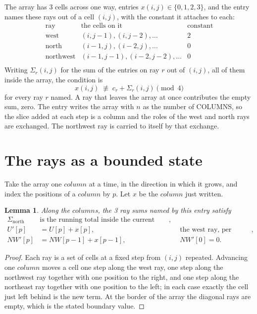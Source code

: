 \documentclass[11pt,a4paper]{article}
\theoremstyle{plain}
\newtheorem{lemma}[theorem]{Lemma}
\theoremstyle{definition}
\begin{document}
The array has $3$ cells across one way, entries $x(i,j)\in\{0,1,2,3\}$, and the entry names these
rays out of a cell $(i,j)$, with the constant it attaches to each:
\[
\begin{array}{lll}
\text{ray} & \text{the cells on it} & \text{constant} \\[2pt]
\text{west} & (i,j-1),(i,j-2),\dots & 2 \\
\text{north} & (i-1,j),(i-2,j),\dots & 0 \\
\text{northwest} & (i-1,j-1),(i-2,j-2),\dots & 0 \\
\end{array}
\]
Writing $\Sigma_r(i,j)$ for the sum of the entries on ray $r$ out of $(i,j)$, all of them
inside the array, the condition is
\[
x(i,j)\;\not\equiv\;c_r+\Sigma_r(i,j) \pmod{4}
\]
for every ray $r$ named. A ray that leaves the array at once contributes the empty sum,
zero. The entry writes the array with $n$ as the number of COLUMNS, so the slice added at each step is a column and the roles of the west and north rays are exchanged. The northwest ray is carried to itself by that exchange.

\section{The rays as a bounded state}

Take the array one $column$ at a time, in the direction in which it grows, and index the
positions of a $column $ by $p$. Let $x$ be the $column$ just written.

\begin{lemma}\label{lem:rays}
Along the $column$s, the 3 ray sums named by this entry satisfy
\[
\begin{aligned}
\Sigma_{\mathrm{north}}\ &\text{is the running total inside the current column},\\
U'[p]&=U[p]+x[p], &&\text{the west ray, per position},\\
NW'[p]&=NW[p-1]+x[p-1], && NW'[0]=0 .
\end{aligned}
\]
\end{lemma}

\begin{proof}
Each ray is a set of cells at a fixed step from $(i,j)$ repeated. Advancing one $column$
moves a cell one step along the west ray, one step along the northwest ray together with one
position to the right, and one step along the northeast ray together with one position to the
left; in each case exactly the cell just left behind is the new term. At the border of the
array the diagonal rays are empty, which is the stated boundary value.
\end{proof}
\end{document}
